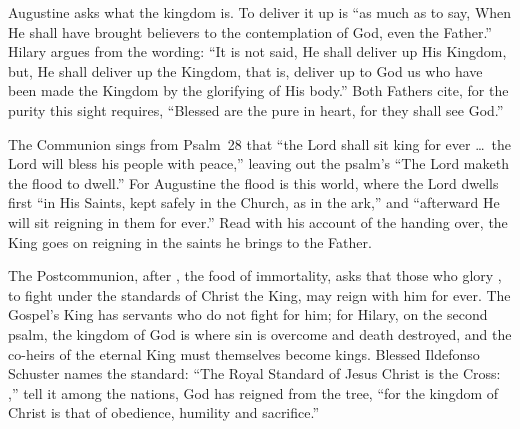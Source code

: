 Augustine asks what the kingdom is. To deliver it up is ``as much as to say,
When He shall have brought believers to the contemplation of God, even the
Father.'' Hilary argues from the wording: ``It is not said, He shall deliver
up His Kingdom, but, He shall deliver up the Kingdom, that is, deliver up to
God us who have been made the Kingdom by the glorifying of His body.'' Both
Fathers cite, for the purity this sight requires, ``Blessed are the pure in
heart, for they shall see God.''

The Communion sings from Psalm~28 that ``the Lord shall sit king for ever
\dots\ the Lord will bless his people with peace,'' leaving out the psalm's
``The Lord maketh the flood to dwell.'' For Augustine the flood is this world,
where the Lord dwells first ``in His Saints, kept safely in the Church, as in
the ark,'' and ``afterward He will sit reigning in them for ever.'' Read with
his account of the handing over, the King goes on reigning in the saints he
brings to the Father.

The Postcommunion, after , the food of
immortality, asks that those who glory , to fight under the standards of Christ the King, may reign with him
for ever. The Gospel's King has servants who do not fight for him; for Hilary,
on the second psalm, the kingdom of God is where sin is overcome and death
destroyed, and the co-heirs of the eternal King must themselves become kings.
Blessed Ildefonso Schuster names the standard: ``The Royal Standard of Jesus
Christ is the Cross: ,''
tell it among the nations, God has reigned from the tree, ``for the kingdom of
Christ is that of obedience, humility and sacrifice.''
